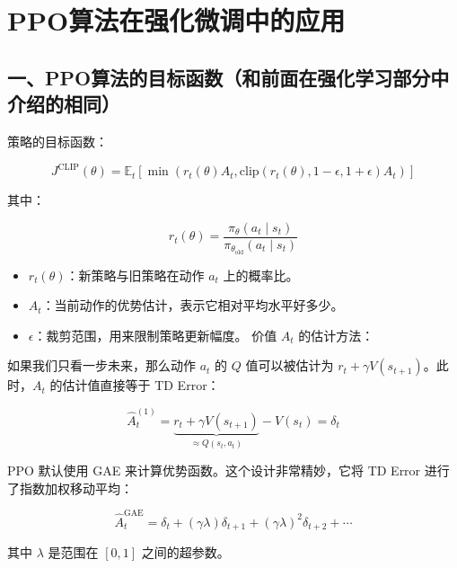 \clearpage

\hypertarget{ppoux7b97ux6cd5ux5728ux5f3aux5316ux5faeux8c03ux4e2dux7684ux5e94ux7528}{%
\section{PPO算法在强化微调中的应用}\label{ppoux7b97ux6cd5ux5728ux5f3aux5316ux5faeux8c03ux4e2dux7684ux5e94ux7528}}

\hypertarget{ux4e00ppoux7b97ux6cd5ux7684ux76eeux6807ux51fdux6570ux548cux524dux9762ux5728ux5f3aux5316ux5b66ux4e60ux90e8ux5206ux4e2dux4ecbux7ecdux7684ux76f8ux540c}{%
\subsection{一、PPO算法的目标函数（和前面在强化学习部分中介绍的相同）}\label{ux4e00ppoux7b97ux6cd5ux7684ux76eeux6807ux51fdux6570ux548cux524dux9762ux5728ux5f3aux5316ux5b66ux4e60ux90e8ux5206ux4e2dux4ecbux7ecdux7684ux76f8ux540c}}

策略的目标函数：

\[
J^{\mathrm{CLIP}}(\theta)
=
\mathbb{E}_t\left[
\min\left(
r_t(\theta)A_t,
\mathrm{clip}(r_t(\theta), 1-\epsilon, 1+\epsilon)A_t
\right)
\right]
\]

其中：

\[
r_t(\theta)=\frac{\pi_\theta(a_t \mid s_t)}{\pi_{\theta_{\mathrm{old}}}(a_t \mid s_t)}
\]

\begin{itemize}
\tightlist
\item
  \(r_t(\theta)\)：新策略与旧策略在动作 \(a_t\) 上的概率比。
\item
  \(A_t\)：当前动作的优势估计，表示它相对平均水平好多少。
\item
  \(\epsilon\)：裁剪范围，用来限制策略更新幅度。
  价值 \(A_t\) 的估计方法：
\end{itemize}

如果我们只看一步未来，那么动作 \(a_t\) 的 \(Q\) 值可以被估计为 \(r_t + \gamma V(s_{t+1})\)。此时，\(A_t\) 的估计值直接等于 TD Error：

\[
\hat{A}_t^{(1)}
=
\underbrace{r_t + \gamma V(s_{t+1})}_{\approx Q(s_t,a_t)}
- V(s_t)
=
\delta_t
\]

PPO 默认使用 GAE 来计算优势函数。这个设计非常精妙，它将 TD Error 进行了指数加权移动平均：

\[
\hat{A}_t^{\mathrm{GAE}}
=
\delta_t
+
(\gamma\lambda)\delta_{t+1}
+
(\gamma\lambda)^2\delta_{t+2}
+
\cdots
\]

其中 \(\lambda\) 是范围在 \([0,1]\) 之间的超参数。

